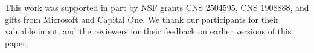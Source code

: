 \documentclass[sigconf]{acmart}
\begin{document}

\maketitle





%



\begin{acks}
This work was supported in part by NSF grants CNS 2504595, CNS 1908888, and gifts from Microsoft and Capital One. We thank our participants for their valuable input, and the reviewers for their feedback on earlier versions of this paper. 
\end{acks}





\appendix
% 
%

\end{document}
